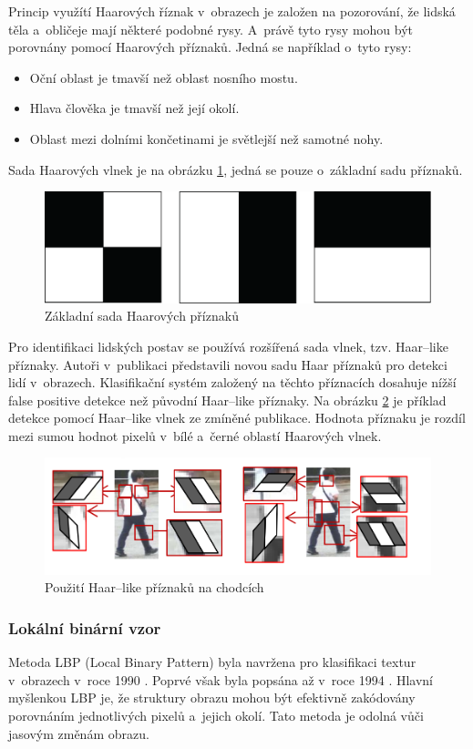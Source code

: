 Princip využítí Haarových říznak v~obrazech je založen na pozorování, že lidská těla a~obličeje mají některé podobné rysy. A~právě tyto rysy mohou být porovnány pomocí Haarových příznaků. Jedná se například o~tyto rysy:
\begin{itemize}
  \item{Oční oblast je tmavší než oblast nosního mostu.}
  \item{Hlava člověka je tmavší než její okolí.}
  \item{Oblast mezi dolními končetinami je světlejší než samotné nohy.}
\end{itemize}
Sada Haarových vlnek je na obrázku \ref{fig:basichaarfeatures}, jedná se pouze o~základní sadu příznaků.
\begin{figure}[H]
\centering
\includegraphics[width=.7\linewidth]{figures/haar_features}
\caption{Základní sada Haarových příznaků}
\label{fig:basichaarfeatures}
\end{figure}

Pro identifikaci lidských postav se používá rozšířená sada vlnek, tzv. Haar--like příznaky. Autoři v~publikaci \cite{haar:like} představili novou sadu Haar příznaků pro detekci lidí v~obrazech. Klasifikační systém založený na těchto příznacích dosahuje nížší false positive detekce než původní Haar--like příznaky.  Na obrázku \ref{fig:haarlike} je příklad detekce pomocí Haar--like vlnek ze zmíněné publikace. Hodnota příznaku je rozdíl mezi sumou hodnot pixelů v~bílé a~černé oblastí Haarových vlnek.
\begin{figure}[H]
\centering
\includegraphics[width=.8\linewidth]{figures/haar-like}
\caption{Použití Haar--like příznaků na chodcích \cite{haar:like}}
\label{fig:haarlike}
\end{figure}

\subsubsection*{Lokální binární vzor}
Metoda LBP (Local Binary Pattern) byla navržena pro klasifikaci textur v~obrazech v~roce 1990 \cite{lbp:texture}. Poprvé však byla popsána až v~roce 1994 \cite{lbp:first}. Hlavní myšlenkou LBP je, že struktury obrazu mohou být efektivně zakódovány porovnáním jednotlivých pixelů a~jejich okolí. Tato metoda je odolná vůči jasovým změnám obrazu.

